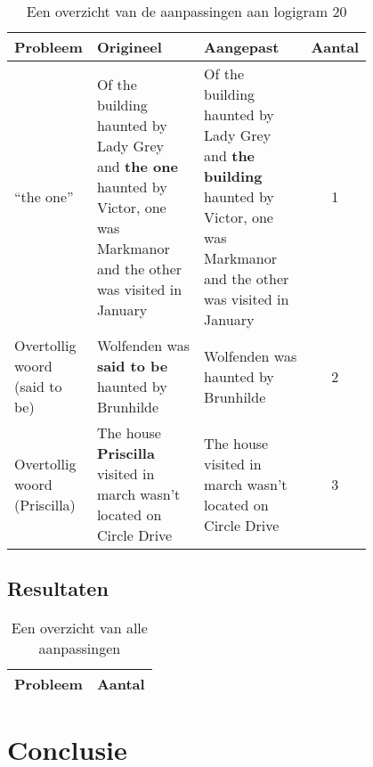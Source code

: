 \begin{table}[h]
  \centering
  \begin{tabular}{p{0.2\linewidth}p{0.3\linewidth}p{0.3\linewidth}c}
    \toprule
    \textbf{Probleem} & \textbf{Origineel} & \textbf{Aangepast} & \textbf{Aantal} \\ 
    \hline
    ``the one'' & Of the building haunted by Lady Grey and \textbf{the one} haunted by Victor, one was Markmanor and the other was visited in January & Of the building haunted by Lady Grey and \textbf{the building} haunted by Victor, one was Markmanor and the other was visited in January & 1 \\
    \hline
    Overtollig woord (said to be) & Wolfenden was \textbf{said to be} haunted by Brunhilde & Wolfenden was haunted by Brunhilde & 2 \\
    \hline
    Overtollig woord (Priscilla) &  The house \textbf{Priscilla} visited in march wasn't located on Circle Drive & The house visited in march wasn't located on Circle Drive & 3 \\
    \bottomrule
  \end{tabular}
  \caption{Een overzicht van de aanpassingen aan logigram 20}
  \label{tbl:log20}
\end{table}

\subsection{Resultaten}
\begin{table}[h]
  \centering
  \begin{tabular}{ll}
    \toprule
    \textbf{Probleem} & \textbf{Aantal} \\ 
    \bottomrule
  \end{tabular}
  \caption{Een overzicht van alle aanpassingen}
  \label{tbl:resultaten}
\end{table}

\section{Conclusie}
